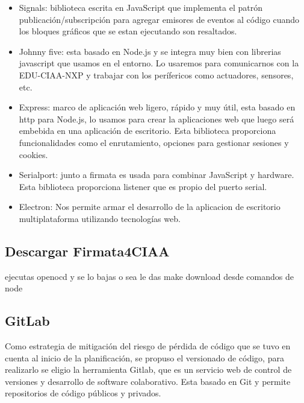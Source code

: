 \begin{itemize}
	\item Signals\citep{signals}: biblioteca escrita en JavaScript que implementa el patrón publicación/subscripción para agregar emisores de eventos al código cuando los bloques gráficos que se estan ejecutando son resaltados.
	
	\item Johnny five\citep{johnny}: esta basado en Node.js y se integra muy bien con librerias javascript que usamos en el entorno. Lo usaremos para comunicarnos con la EDU-CIAA-NXP y trabajar con los perífericos como actuadores, sensores, etc.
	
	\item Express\citep{express}:  marco de aplicación web ligero, rápido y muy útil, esta basado en http para Node.js, lo usamos para crear la aplicaciones web que luego será embebida en una aplicación de escritorio. Esta biblioteca  proporciona funcionalidades como el enrutamiento, opciones para gestionar sesiones y cookies.
	
	\item Serialport\citep{serialport}: junto a firmata es usada para combinar JavaScript y hardware. Esta biblioteca proporciona listener que es propio del puerto serial.
	
	\item Electron\citep{electron}: Nos permite armar el desarrollo de la aplicacion de escritorio multiplataforma utilizando tecnologías web.
\end{itemize}

\subsection{Descargar Firmata4CIAA}
\label{subsec:Descargar Firmata4CIAA}

ejecutas openocd y se lo bajas
o sea le das make download desde comandos de node

\subsection{GitLab}
\label{subsec:GitLab}

Como estrategia de mitigación del riesgo de pérdida de código que se tuvo en cuenta al inicio de la planificación, se propuso el versionado de código, para realizarlo se eligio la herramienta Gitlab, que es un servicio web de control de versiones y desarrollo de software colaborativo. Esta basado en Git y permite repositorios de código públicos y privados. 

